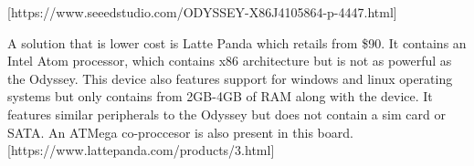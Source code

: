 [https://www.seeedstudio.com/ODYSSEY-X86J4105864-p-4447.html] 

A solution that is lower cost is Latte Panda which retails from \$90. It contains an Intel Atom processor, which contains x86 architecture but is not as powerful as the Odyssey. This device also features support for windows and linux operating systems but only contains from 2GB-4GB of RAM along with the device. It features similar peripherals to the Odyssey but does not contain a sim card or SATA.  An ATMega co-proccesor is also present in this board. [https://www.lattepanda.com/products/3.html] 







